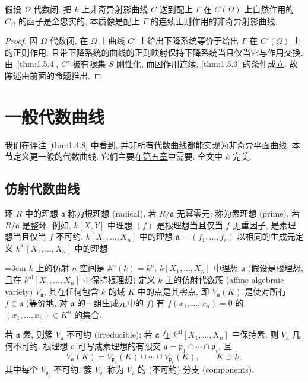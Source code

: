 \begin{proposition} \label{thm:1.5.5} 
假设 $\Omega$ 代数闭. 把 $k$ 上非奇异射影曲线 $C$ 送到配上 $\Gamma$ 在 $C(\Omega)$ 上自然作用的 $C_\Omega$ 的函子是全忠实的, 本质像是配上 $\Gamma$ 的连续正则作用的非奇异射影曲线.
\end{proposition}

\begin{proof}
因 $\Omega$ 代数闭, 在 $\Omega$ 上曲线 $C'$ 上给出下降系统等价于给出 $\Gamma$ 在 $C'(\Omega)$ 上的正则作用. 且带下降系统的曲线的正则映射保持下降系统当且仅当它与作用交换. 由~\ref{thm:1.5.4}, $C'$ 被有限集 $S$ 刚性化, 而因作用连续, \ref{thm:1.5.3} 的条件成立. 故陈述由前面的命题推出.
\end{proof}

\section{一般代数曲线}\label{sec:1.6}

我们在评注 \ref{thm:1.4.8} 中看到, 并非所有代数曲线都能实现为非奇异平面曲线. 本节定义更一般的代数曲线. 它们主要在\hyperref[ch:5]{第五章}中需要. 全文中 $k$ 完美.

\subsection*{仿射代数曲线}

环 $R$ 中的理想 $\mathfrak{a}$ 称为根理想 (radical), 若 $R/\mathfrak{a}$ 无幂零元; 称为素理想 (prime), 若 $R/\mathfrak{a}$ 是整环. 例如, $k[X,Y]$ 中理想 $(f)$ 是根理想当且仅当 $f$ 无重因子, 是素理想当且仅当 $f$ 不可约. $k[X_1,\dots,X_n]$ 中的理想 $\mathfrak{a} = (f_1,\dots,f_r)$ 以相同的生成元定义 $k^{\mathrm{al}}[X_1,\dots,X_n]$ 中的理想.

{\emergencystretch=3em $k$ 上的仿射 $n$-空间是 $\mathbb{A}^n(k) = k^n$. $k[X_1,\dots,X_n]$ 中理想 $\mathfrak{a}$ (假设是根理想, 且在 $k^{\mathrm{al}}[X_1,\dots,X_n]$ 中保持根理想) 定义 $k$ 上的仿射代数簇 (affine algebraic variety) $V_\mathfrak{a}$, 其在任何包含 $k$ 的域 $K$ 中的点是其零点, 即 $V_\mathfrak{a}(K)$ 是使对所有 $f\in\mathfrak{a}$ (等价地, 对 $\mathfrak{a}$ 的一组生成元中的 $f$) 有 $f(x_1,\dots,x_n) = 0$ 的 $(x_1,\dots,x_n)\in K^n$ 的集合.\par}

若 $\mathfrak{a}$ 素, 则簇 $V_\mathfrak{a}$ 不可约 (irreducible); 若 $\mathfrak{a}$ 在 $k^{\mathrm{al}}[X_1,\dots,X_n]$ 中保持素, 则 $V_\mathfrak{a}$ 几何不可约. 根理想 $\mathfrak{a}$ 可写成素理想的有限交 $\mathfrak{a} = \mathfrak{p}_1\cap\cdots\cap\mathfrak{p}_r$, 且
\[
V_\mathfrak{a}(K) = V_{\mathfrak{p}_1}(K)\cup\cdots\cup V_{\mathfrak{p}_r}(K), \qquad K\supset k,
\]
其中每个 $V_{\mathfrak{p}_i}$ 不可约. 簇 $V_{\mathfrak{p}_i}$ 称为 $V_\mathfrak{a}$ 的 (不可约) 分支 (components).

